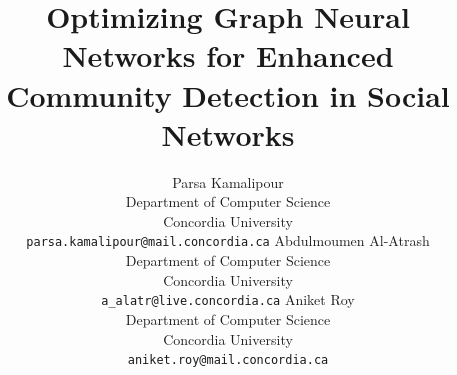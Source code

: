 \documentclass{article}
\title{Optimizing Graph Neural Networks for Enhanced Community Detection in Social Networks
}
\author{%
  Parsa Kamalipour\\
  Department of Computer Science \\
  Concordia University \\
  \texttt{parsa.kamalipour@mail.concordia.ca} 
  \And
  Abdulmoumen Al-Atrash \\
  Department of Computer Science \\
  Concordia University \\
  \texttt{a\_alatr@live.concordia.ca} 
  \And
  Aniket Roy \\
  Department of Computer Science \\
  Concordia University \\
  \texttt{aniket.roy@mail.concordia.ca} 
}
\begin{document}
\maketitle

\begin{abstract}

\end{abstract}
\end{document}
